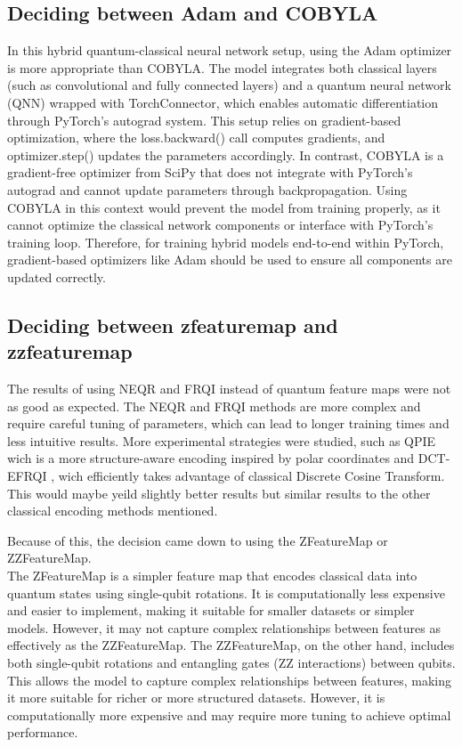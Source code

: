 \documentclass[conference]{IEEEtran}
\begin{document}
\subsection*{\fontsize{12}{16}\selectfont Deciding between Adam and COBYLA}

In this hybrid quantum-classical neural network setup, using the Adam optimizer is more appropriate than COBYLA. The model integrates both classical layers (such as convolutional and fully connected layers) and a quantum neural network (QNN) wrapped with TorchConnector, which enables automatic differentiation through PyTorch's autograd system. This setup relies on gradient-based optimization, where the loss.backward() call computes gradients, and optimizer.step() updates the parameters accordingly. In contrast, COBYLA is a gradient-free optimizer from SciPy that does not integrate with PyTorch's autograd and cannot update parameters through backpropagation. Using COBYLA in this context would prevent the model from training properly, as it cannot optimize the classical network components or interface with PyTorch's training loop. Therefore, for training hybrid models end-to-end within PyTorch, gradient-based optimizers like Adam should be used to ensure all components are updated correctly.

\subsection*{\fontsize{12}{16}\selectfont Deciding between zfeaturemap and zzfeaturemap}

The results of using NEQR and FRQI instead of quantum feature maps were not as good as expected.
The NEQR and FRQI methods are more complex and require careful tuning of parameters, which can lead to longer training times and less intuitive results.
More experimental strategies were studied, such as QPIE \cite{https://doi.org/10.1038/s41598-023-30575-2www.nature.com/scientificreports} wich is a more structure-aware encoding inspired by polar coordinates and DCT-EFRQI \cite{arXiv:2203.01831v1}, wich efficiently takes advantage of classical Discrete Cosine Transform. This would maybe yeild slightly better results but similar results to the other classical encoding methods mentioned.

Because of this, the decision came down to using the ZFeatureMap or ZZFeatureMap.\\
The ZFeatureMap is a simpler feature map that encodes classical data into quantum states using single-qubit rotations. It is computationally less expensive and easier to implement, making it suitable for smaller datasets or simpler models. However, it may not capture complex relationships between features as effectively as the ZZFeatureMap.
The ZZFeatureMap, on the other hand, includes both single-qubit rotations and entangling gates (ZZ interactions) between qubits. This allows the model to capture complex relationships between features, making it more suitable for richer or more structured datasets. However, it is computationally more expensive and may require more tuning to achieve optimal performance.
\end{document}
